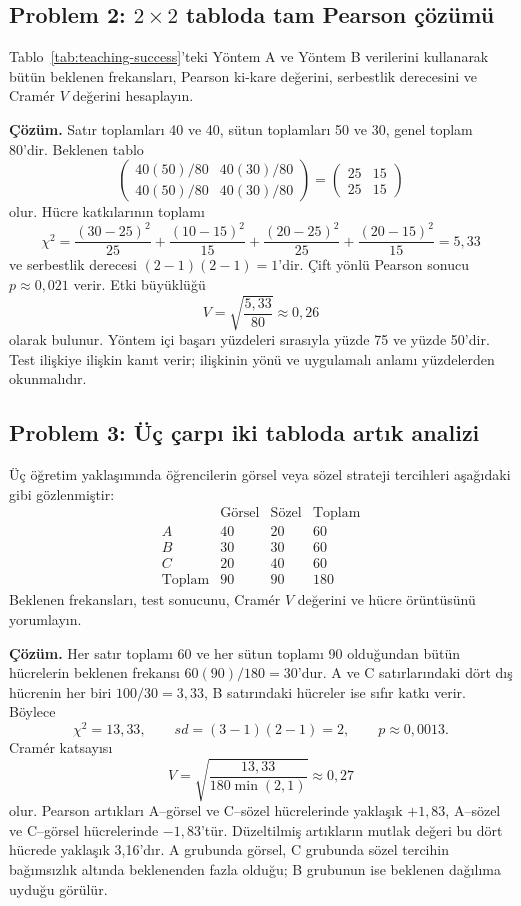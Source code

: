 \subsection*{Problem 2: $2\times2$ tabloda tam Pearson çözümü}

Tablo~\ref{tab:teaching-success}'teki Yöntem A ve Yöntem B verilerini
kullanarak bütün beklenen
frekansları, Pearson ki-kare değerini, serbestlik derecesini ve Cramér $V$
değerini hesaplayın.

\textbf{Çözüm.} Satır toplamları 40 ve 40, sütun toplamları 50 ve 30,
genel toplam 80'dir. Beklenen tablo
\[
\begin{pmatrix}
40(50)/80 & 40(30)/80\\
40(50)/80 & 40(30)/80
\end{pmatrix}
=
\begin{pmatrix}25&15\\25&15\end{pmatrix}
\]
olur. Hücre katkılarının toplamı
\[
\chi^2=\frac{(30-25)^2}{25}+\frac{(10-15)^2}{15}
+\frac{(20-25)^2}{25}+\frac{(20-15)^2}{15}=5{,}33
\]
ve serbestlik derecesi $(2-1)(2-1)=1$'dir. Çift yönlü Pearson sonucu
$p\approx0{,}021$ verir. Etki büyüklüğü
\[
V=\sqrt{\frac{5{,}33}{80}}\approx0{,}26
\]
olarak bulunur. Yöntem içi başarı yüzdeleri sırasıyla yüzde 75 ve yüzde
50'dir. Test ilişkiye ilişkin kanıt verir; ilişkinin yönü ve uygulamalı anlamı
yüzdelerden okunmalıdır.

\subsection*{Problem 3: Üç çarpı iki tabloda artık analizi}

Üç öğretim yaklaşımında öğrencilerin görsel veya sözel strateji tercihleri
aşağıdaki gibi gözlenmiştir:
\[
\begin{array}{c|rr|r}
 & \text{Görsel} & \text{Sözel} & \text{Toplam}\\ \hline
A&40&20&60\\
B&30&30&60\\
C&20&40&60\\ \hline
\text{Toplam}&90&90&180
\end{array}
\]
Beklenen frekansları, test sonucunu, Cramér $V$ değerini ve hücre örüntüsünü
yorumlayın.

\textbf{Çözüm.} Her satır toplamı 60 ve her sütun toplamı 90 olduğundan bütün
hücrelerin beklenen frekansı $60(90)/180=30$'dur. A ve C satırlarındaki dört
dış hücrenin her biri $100/30=3{,}33$, B satırındaki hücreler ise sıfır katkı
verir. Böylece
\[
\chi^2=13{,}33,\qquad sd=(3-1)(2-1)=2,
\qquad p\approx0{,}0013.
\]
Cramér katsayısı
\[
V=\sqrt{\frac{13{,}33}{180\min(2,1)}}\approx0{,}27
\]
olur. Pearson artıkları A--görsel ve C--sözel hücrelerinde yaklaşık $+1{,}83$,
A--sözel ve C--görsel hücrelerinde $-1{,}83$'tür. Düzeltilmiş artıkların
mutlak değeri bu dört hücrede yaklaşık 3,16'dır. A grubunda görsel, C grubunda
sözel tercihin bağımsızlık altında beklenenden fazla olduğu; B grubunun ise
beklenen dağılıma uyduğu görülür.

